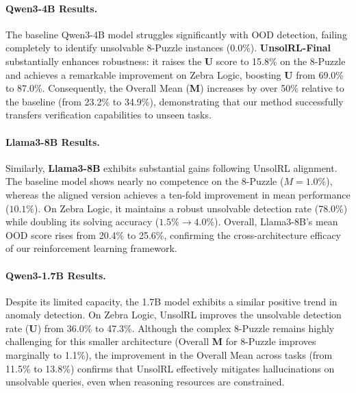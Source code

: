 \paragraph{Qwen3-4B Results.} 
The baseline Qwen3-4B model struggles significantly with OOD detection, failing completely to identify unsolvable 8-Puzzle instances (0.0\%). \textbf{UnsolRL-Final} substantially enhances robustness: it raises the \textbf{U} score to 15.8\% on the 8-Puzzle and achieves a remarkable improvement on Zebra Logic, boosting \textbf{U} from 69.0\% to 87.0\%. Consequently, the Overall Mean (\textbf{M}) increases by over 50\% relative to the baseline (from 23.2\% to 34.9\%), demonstrating that our method successfully transfers verification capabilities to unseen tasks.

\paragraph{Llama3-8B Results.}
Similarly, \textbf{Llama3-8B} exhibits substantial gains following UnsolRL alignment. The baseline model shows nearly no competence on the 8-Puzzle ($M=1.0\%$), whereas the aligned version achieves a ten-fold improvement in mean performance ($10.1\%$). On Zebra Logic, it maintains a robust unsolvable detection rate (78.0\%) while doubling its solving accuracy ($1.5\% \to 4.0\%$). Overall, Llama3-8B's mean OOD score rises from 20.4\% to 25.6\%, confirming the cross-architecture efficacy of our reinforcement learning framework.

\paragraph{Qwen3-1.7B Results.} 
Despite its limited capacity, the 1.7B model exhibits a similar positive trend in anomaly detection. On Zebra Logic, UnsolRL improves the unsolvable detection rate (\textbf{U}) from 36.0\% to 47.3\%. Although the complex 8-Puzzle remains highly challenging for this smaller architecture (Overall \textbf{M} for 8-Puzzle improves marginally to 1.1\%), the improvement in the Overall Mean across tasks (from 11.5\% to 13.8\%) confirms that UnsolRL effectively mitigates hallucinations on unsolvable queries, even when reasoning resources are constrained.

